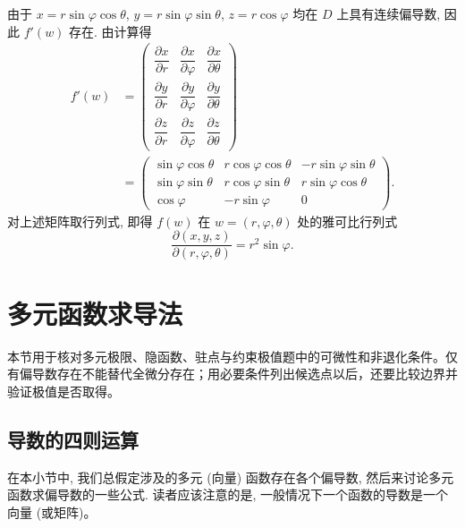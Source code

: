 \documentclass[12pt,fontset=fandol]{ctexart}
\begin{document}
\begin{solve}\quad 由于 $x=r\sin\varphi\cos\theta$, $y=r\sin\varphi\sin\theta$, $z=r\cos\varphi$ 均在 $D$ 上具有连续偏导数, 因此 $f'(w)$ 存在. 由计算得
\[
\begin{aligned}
  f'(w)
  &=
  \begin{pmatrix}
    \dfrac{\partial x}{\partial r}&\dfrac{\partial x}{\partial\varphi}&\dfrac{\partial x}{\partial\theta}\\
    \dfrac{\partial y}{\partial r}&\dfrac{\partial y}{\partial\varphi}&\dfrac{\partial y}{\partial\theta}\\
    \dfrac{\partial z}{\partial r}&\dfrac{\partial z}{\partial\varphi}&\dfrac{\partial z}{\partial\theta}
  \end{pmatrix}\\
  &=
  \begin{pmatrix}
    \sin\varphi\cos\theta&r\cos\varphi\cos\theta&-r\sin\varphi\sin\theta\\
    \sin\varphi\sin\theta&r\cos\varphi\sin\theta&r\sin\varphi\cos\theta\\
    \cos\varphi&-r\sin\varphi&0
  \end{pmatrix}.
\end{aligned}
\]
对上述矩阵取行列式, 即得 $f(w)$ 在 $w=(r,\varphi,\theta)$ 处的雅可比行列式
\[
  \frac{\partial(x,y,z)}{\partial(r,\varphi,\theta)}=r^2\sin\varphi.
\]

\end{solve}


\section{多元函数求导法}\label{course-14-2}
本节用于核对多元极限、隐函数、驻点与约束极值题中的可微性和非退化条件。仅有偏导数存在不能替代全微分存在；用必要条件列出候选点以后，还要比较边界并验证极值是否取得。

\subsection{导数的四则运算}

在本小节中, 我们总假定涉及的多元 (向量) 函数存在各个偏导数, 然后来讨论多元函数求偏导数的一些公式. 读者应该注意的是, 一般情况下一个函数的导数是一个向量 (或矩阵)。
\end{document}
